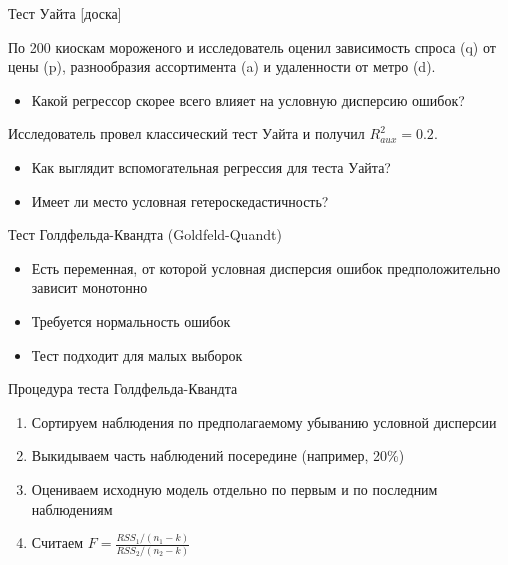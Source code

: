\documentclass[ignorenonframetext,]{beamer}
\begin{document}
\begin{frame}{Тест Уайта {[}доска{]}}

По 200 киоскам мороженого и исследователь оценил зависимость спроса (q)
от цены (p), разнообразия ассортимента (a) и удаленности от метро (d).

\begin{itemize}
\itemsep1pt\parskip0pt
\item
  Какой регрессор скорее всего влияет на условную дисперсию ошибок?
\end{itemize}

Исследователь провел классический тест Уайта и получил $R^2_{aux}=0.2$.

\begin{itemize}
\item
  Как выглядит вспомогательная регрессия для теста Уайта?
\item
  Имеет ли место условная гетероскедастичность?
\end{itemize}

\end{frame}

\begin{frame}{Тест Голдфельда-Квандта (Goldfeld-Quandt)}

\begin{itemize}
\item
  Есть переменная, от которой условная дисперсия ошибок предположительно
  зависит монотонно
\item
  Требуется нормальность ошибок
\item
  Тест подходит для малых выборок
\end{itemize}

\end{frame}

\begin{frame}{Процедура теста Голдфельда-Квандта}

\begin{enumerate}
\def\labelenumi{\arabic{enumi}.}
\item
  Сортируем наблюдения по предполагаемому убыванию условной дисперсии
\item
  Выкидываем часть наблюдений посередине (например, 20\%)
\item
  Оцениваем исходную модель отдельно по первым и по последним
  наблюдениям
\item
  Считаем $F=\frac{RSS_1/(n_1-k)}{RSS_2/(n_2-k)}$
\end{enumerate}

\end{frame}
\end{document}
